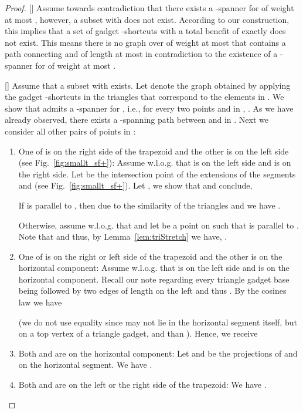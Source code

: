\documentclass[a4paper]{llncs}
\begin{document}
\begin{proof}

[] Assume towards contradiction that 
there exists a -spanner for  of weight at most , however, 
a subset  with  does not exist. 
According to our construction, this implies that a set of gadget -shortcuts 
with a total benefit of exactly  does not exist. 
This means there is no graph over 
of weight at most  that contains a path connecting  and  of length at most  
in contradiction to the existence of a -spanner for  of weight at most .

[] Assume that a subset  with  exists.
Let  denote the graph obtained by applying the gadget -shortcuts
in the triangles that correspond to the elements in .
We show that  admits a -spanner for , i.e., 
for every two points  and  in , .
As we have already observed, there exists a -spanning path between  and  in .
Next we consider all other pairs of points  in :
\begin{enumerate}

\item One of  is on the right side of the trapezoid 
and the other is on the left side (see Fig.~\ref{fig:smallt_sf+}):
Assume w.l.o.g. that  is on the left side and  is on the right side.
Let  be the intersection point of the extensions of the segments  and 
(see Fig.~\ref{fig:smallt_sf+}).
Let ,
we show that 
and conclude,


If  is parallel to , then 
due to the similarity of the triangles  and 
we have .

Otherwise, assume w.l.o.g. that  and let  be a point
on  such that  is parallel to .
Note that  and thus, by Lemma~\ref{lem:triStretch} 
we have, .


\item One of  is on the right or left side of the trapezoid 
and the other is on the horizontal component:
Assume w.l.o.g. that  is on the left side and  is on 
the horizontal component.
Recall our note regarding every triangle gadget base being
followed by two edges of length  on the left and thus 
.
By the cosines law we have 

(we do not use equality since  may not lie in the horizontal segment itself, 
but on a top vertex of a triangle gadget,
and than ).
Hence, we receive



\item Both  and  are on the horizontal component:
Let  and  be the projections of  and  on the horizontal segment.
We have .


\item Both  and  are on the left or the right side of the trapezoid:
We have .


\end{enumerate}

\end{proof}
\end{document}
